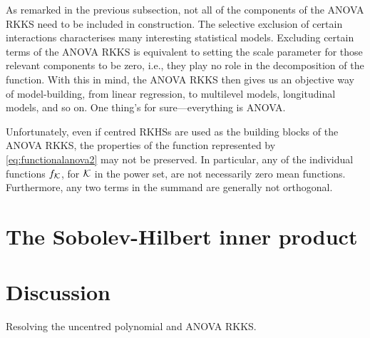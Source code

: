 \documentclass[a4paper,showframe,11pt,draft]{report}
\begin{document}
As remarked in the previous subsection, not all of the components of the ANOVA RKKS need to be included in construction.
The selective exclusion of certain interactions characterises many interesting statistical models.
Excluding certain terms of the ANOVA RKKS is equivalent to setting the scale parameter for those relevant components to be zero, i.e., they play no role in the decomposition of the function.
With this in mind, the ANOVA RKKS then gives us an objective way of model-building, from linear regression, to multilevel models, longitudinal models, and so on.
One thing's for sure---everything is ANOVA.

\begin{remark}
  Unfortunately, even if centred RKHSs are used as the building blocks of the ANOVA RKKS, the properties of the function represented by \eqref{eq:functionalanova2} may not be preserved.
  In particular, any of the individual functions $f_{\mathcal K}$, for ${\mathcal K}$ in the power set, are not necessarily zero mean functions.
  Furthermore, any two terms in the summand are generally not orthogonal.
\end{remark}

\section{The Sobolev-Hilbert inner product}

\section{Discussion}

Resolving the uncentred polynomial and ANOVA RKKS.




%

%
%
%
%
%
%
%


\hClosingStuffStandalone
\end{document}
